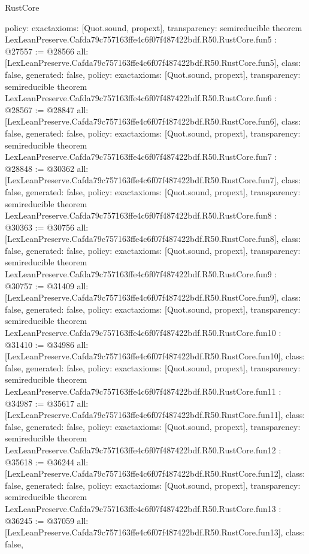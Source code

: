 \begin{lexlean}{RustCore}
\begin{coremodule}
{  policy: exact{axioms: [Quot.sound, propext]},
  transparency: semireducible
}
theorem LexLeanPreserve.Cafda79c757163ffe4c6f07f487422bdf.R50.RustCore.fun5 : @27557 := @28566 {
  all: [LexLeanPreserve.Cafda79c757163ffe4c6f07f487422bdf.R50.RustCore.fun5],
  class: false,
  generated: false,
  policy: exact{axioms: [Quot.sound, propext]},
  transparency: semireducible
}
theorem LexLeanPreserve.Cafda79c757163ffe4c6f07f487422bdf.R50.RustCore.fun6 : @28567 := @28847 {
  all: [LexLeanPreserve.Cafda79c757163ffe4c6f07f487422bdf.R50.RustCore.fun6],
  class: false,
  generated: false,
  policy: exact{axioms: [Quot.sound, propext]},
  transparency: semireducible
}
theorem LexLeanPreserve.Cafda79c757163ffe4c6f07f487422bdf.R50.RustCore.fun7 : @28848 := @30362 {
  all: [LexLeanPreserve.Cafda79c757163ffe4c6f07f487422bdf.R50.RustCore.fun7],
  class: false,
  generated: false,
  policy: exact{axioms: [Quot.sound, propext]},
  transparency: semireducible
}
theorem LexLeanPreserve.Cafda79c757163ffe4c6f07f487422bdf.R50.RustCore.fun8 : @30363 := @30756 {
  all: [LexLeanPreserve.Cafda79c757163ffe4c6f07f487422bdf.R50.RustCore.fun8],
  class: false,
  generated: false,
  policy: exact{axioms: [Quot.sound, propext]},
  transparency: semireducible
}
theorem LexLeanPreserve.Cafda79c757163ffe4c6f07f487422bdf.R50.RustCore.fun9 : @30757 := @31409 {
  all: [LexLeanPreserve.Cafda79c757163ffe4c6f07f487422bdf.R50.RustCore.fun9],
  class: false,
  generated: false,
  policy: exact{axioms: [Quot.sound, propext]},
  transparency: semireducible
}
theorem LexLeanPreserve.Cafda79c757163ffe4c6f07f487422bdf.R50.RustCore.fun10 : @31410 := @34986 {
  all: [LexLeanPreserve.Cafda79c757163ffe4c6f07f487422bdf.R50.RustCore.fun10],
  class: false,
  generated: false,
  policy: exact{axioms: [Quot.sound, propext]},
  transparency: semireducible
}
theorem LexLeanPreserve.Cafda79c757163ffe4c6f07f487422bdf.R50.RustCore.fun11 : @34987 := @35617 {
  all: [LexLeanPreserve.Cafda79c757163ffe4c6f07f487422bdf.R50.RustCore.fun11],
  class: false,
  generated: false,
  policy: exact{axioms: [Quot.sound, propext]},
  transparency: semireducible
}
theorem LexLeanPreserve.Cafda79c757163ffe4c6f07f487422bdf.R50.RustCore.fun12 : @35618 := @36244 {
  all: [LexLeanPreserve.Cafda79c757163ffe4c6f07f487422bdf.R50.RustCore.fun12],
  class: false,
  generated: false,
  policy: exact{axioms: [Quot.sound, propext]},
  transparency: semireducible
}
theorem LexLeanPreserve.Cafda79c757163ffe4c6f07f487422bdf.R50.RustCore.fun13 : @36245 := @37059 {
  all: [LexLeanPreserve.Cafda79c757163ffe4c6f07f487422bdf.R50.RustCore.fun13],
  class: false,
}
\end{coremodule}
\end{lexlean}
